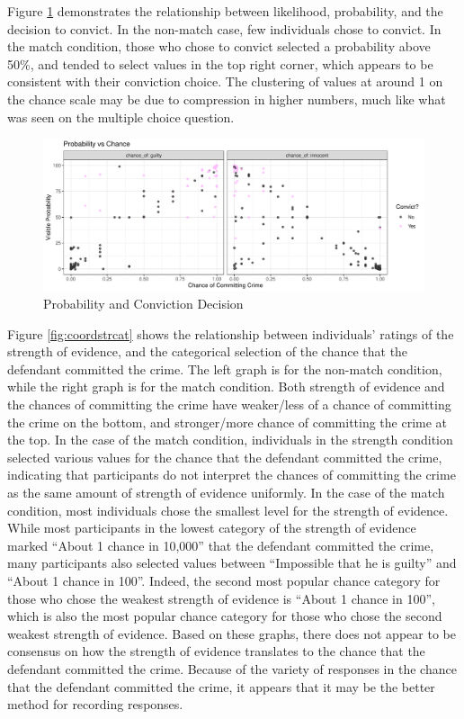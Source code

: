 \documentclass[print]{nuthesis}
\begin{document}
Figure \ref{fig:likeconvict} demonstrates the relationship between likelihood, probability, and the decision to convict.
In the non-match case, few individuals chose to convict.
In the match condition, those who chose to convict selected a probability above 50\%, and tended to select values in the top right corner, which appears to be consistent with their conviction choice.
The clustering of values at around 1 on the chance scale may be due to compression in higher numbers, much like what was seen on the multiple choice question.

\begin{figure}

{\centering \includegraphics[width=\linewidth]{thesis_files/figure-latex/likeconvict-1} 

}

\caption{Probability and Conviction Decision}\label{fig:likeconvict}
\end{figure}

Figure \ref{fig:coordstrcat} shows the relationship between individuals' ratings of the strength of evidence, and the categorical selection of the chance that the defendant committed the crime.
The left graph is for the non-match condition, while the right graph is for the match condition.
Both strength of evidence and the chances of committing the crime have weaker/less of a chance of committing the crime on the bottom, and stronger/more chance of committing the crime at the top.
In the case of the match condition, individuals in the strength condition selected various values for the chance that the defendant committed the crime, indicating that participants do not interpret the chances of committing the crime as the same amount of strength of evidence uniformly.
In the case of the match condition, most individuals chose the smallest level for the strength of evidence.
While most participants in the lowest category of the strength of evidence marked ``About 1 chance in 10,000'' that the defendant committed the crime, many participants also selected values between ``Impossible that he is guilty'' and ``About 1 chance in 100''.
Indeed, the second most popular chance category for those who chose the weakest strength of evidence is ``About 1 chance in 100'', which is also the most popular chance category for those who chose the second weakest strength of evidence.
Based on these graphs, there does not appear to be consensus on how the strength of evidence translates to the chance that the defendant committed the crime.
Because of the variety of responses in the chance that the defendant committed the crime, it appears that it may be the better method for recording responses.
\end{document}
